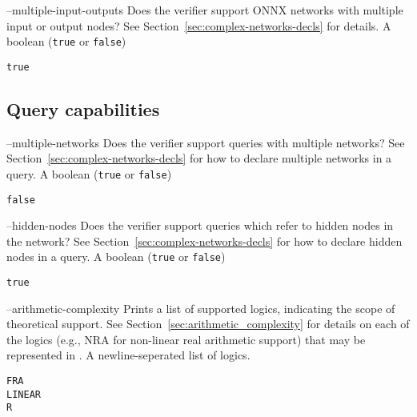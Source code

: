 \clOutputOption
{--multiple-input-outputs}
{Does the verifier support ONNX networks with multiple input or output nodes? See Section~\ref{sec:complex-networks-decls} for details.}
{A boolean (\texttt{true} or \texttt{false})}
\begin{lstlisting}[style=bash]
%*\exampleVerifier* supports --multiple-inputs-outputs
true
\end{lstlisting}

\subsection{Query capabilities}

\clOutputOption
{--multiple-networks}
{Does the verifier support queries with multiple networks? See Section~\ref{sec:complex-networks-decls} for how to declare multiple networks in a query.}
{A boolean (\texttt{true} or \texttt{false})}
\begin{lstlisting}[style=bash]
%*\exampleVerifier* supports --multiple-networks
false
\end{lstlisting}

\clOutputOption
{--hidden-nodes}
{Does the verifier support queries which refer to hidden nodes in the network? See Section~\ref{sec:complex-networks-decls} for how to declare hidden nodes in a query.}
{A boolean (\texttt{true} or \texttt{false})}
\begin{lstlisting}[style=bash]
%*\exampleVerifier* supports --hidden-nodes
true
\end{lstlisting}

\clOutputOption
{--arithmetic-complexity}
{Prints a list of supported \vnnlib{} logics, indicating the scope of theoretical support. See Section~\ref{sec:arithmetic_complexity} for 
    details on each of the logics (e.g., NRA for non-linear real arithmetic support) that may be represented in \vnnlib{}.
}
{A newline-seperated list of logics.}
\begin{lstlisting}[style=bash]
%*\exampleVerifier* supports --logics
FRA
LINEAR
R
\end{lstlisting}



